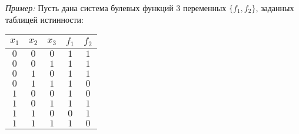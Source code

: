 \documentclass[10pt]{article}
\begin{document}
\par\textit{Пример:} Пусть дана система булевых функций 3 переменных $\{f_1, f_2 \}$, заданных таблицей истинности:
\par\begin{tabular}{|c|c|c|c|c|}
    \hline
    $x_1$ & $x_2$ & $x_3$ & $f_1$ & $f_2$ \\
    \hline
    $0$ & $0$ & $0$ & $1$ & $1$ \\
    $0$ & $0$ & $1$ & $1$ & $1$ \\
    $0$ & $1$ & $0$ & $1$ & $1$ \\
    $0$ & $1$ & $1$ & $1$ & $0$ \\
    $1$ & $0$ & $0$ & $1$ & $0$ \\
    $1$ & $0$ & $1$ & $1$ & $1$ \\
    $1$ & $1$ & $0$ & $0$ & $1$ \\
    $1$ & $1$ & $1$ & $1$ & $0$ \\
    \hline
\end{tabular}
\end{document}

